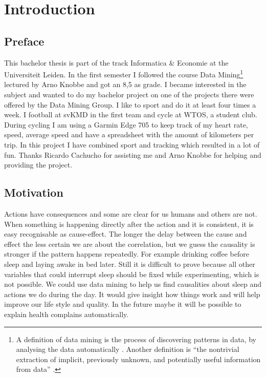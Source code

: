 \section{Introduction}
	\subsection{Preface}
		This bachelor thesis is part of the track Informatica \& Economie at the Universiteit Leiden. In the first semester I followed the course Data Mining\footnote{A definition of data mining is the process of discovering patterns in data, by analysing the data automatically \cite{datamining}. Another definition is ``the nontrivial extraction of implicit, previously unknown, and potentially useful information from data'' \cite{frawley}.} lectured by Arno Knobbe and got an 8,5 as grade. I became interested in the subject and wanted to do my bachelor project on one of the projects there were offered by the Data Mining Group. I like to sport and do it at least four times a week. I football at svKMD in the first team and cycle at WTOS, a student club. During cycling I am using a Garmin Edge 705 to keep track of my heart rate, speed, average speed and have a spreadsheet with the amount of kilometers per trip. In this project I have combined sport and tracking which resulted in a lot of fun. Thanks Ricardo Cachucho for assisting me and Arno Knobbe for helping and providing the project.

	\subsection{Motivation}
		\label{seq:motivation}
		Actions have consequences and some are clear for us humans and others are not. When something is happening directly after the action and it is consistent, it is easy recognisable as cause-effect. The longer the delay between the cause and effect the less certain we are about the correlation, but we guess the causality is stronger if the pattern happens repeatedly. For example drinking coffee before sleep and laying awake in bed later. Still it is difficult to prove because all other variables that could interrupt sleep should be fixed while experimenting, which is not possible. We could use data mining to help us find causalities about sleep and actions we do during the day. It would give insight how things work and will help improve our life style and quality. In the future maybe it will be possible to explain health complains automatically.

